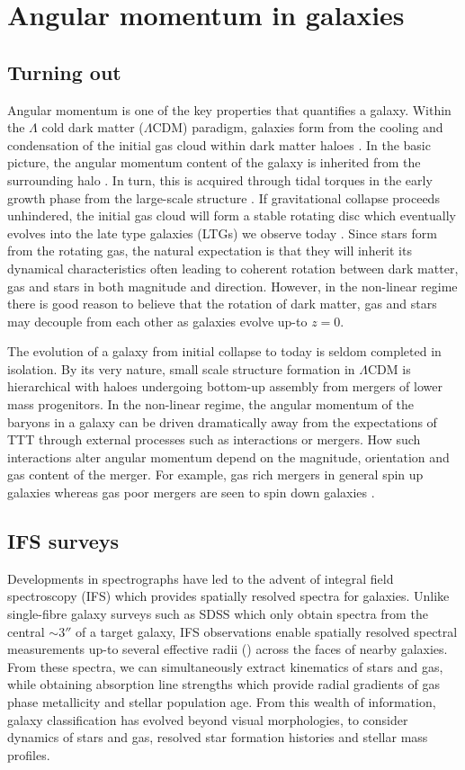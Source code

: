 \section{Angular momentum in galaxies} \label{sec:ang_mom_intro}
\subsection{Turning out}
Angular momentum is one of the key properties that quantifies a galaxy. Within the $\Lambda$ cold dark matter ($\Lambda$CDM) paradigm, galaxies form from the cooling and condensation of the initial gas cloud within dark matter haloes \citep{white1978, mo1998}. In the basic picture, the angular momentum content of the galaxy is inherited from the surrounding halo \citep[][]{fall1980}. In turn, this is acquired through tidal torques in the early growth phase from the large-scale structure \citep[e.g.][]{peebles1969, Doroshkevich1970}. If gravitational collapse proceeds unhindered, the initial gas cloud will form a stable rotating disc which eventually evolves into the late type galaxies (LTGs) we observe today \citep{white1978}. Since stars form from the rotating gas, the natural expectation is that they will inherit its dynamical characteristics often leading to coherent rotation between dark matter, gas and stars in both magnitude and direction. However, in the non-linear regime there is good reason to believe that the rotation of dark matter, gas and stars may decouple from each other as galaxies evolve up-to $z=0$. 

The evolution of a galaxy from initial collapse to today is seldom completed in isolation. By its very nature, small scale structure formation in $\Lambda$CDM is hierarchical with haloes undergoing bottom-up assembly from mergers of lower mass progenitors. In the non-linear regime, the angular momentum of the baryons in a galaxy can be driven dramatically away from the expectations of TTT through external processes such as interactions or mergers. How such interactions alter angular momentum depend on the magnitude, orientation and gas content of the merger. For example, gas rich mergers in general spin up galaxies whereas gas poor mergers are seen to spin down galaxies \citep[][]{lagos2017,lagos2018}.

\subsection{IFS surveys}
Developments in spectrographs have led to the advent of integral field spectroscopy (IFS) which provides spatially resolved spectra for galaxies. Unlike single-fibre galaxy surveys such as SDSS which only obtain spectra from the central $\sim 3 ''$ of a target galaxy, IFS observations enable spatially resolved spectral measurements up-to several effective radii (\re) across the faces of nearby galaxies. From these spectra, we can simultaneously extract kinematics of stars and gas, while obtaining absorption line strengths which provide radial gradients of gas phase metallicity and stellar population age. From this wealth of information, galaxy classification has evolved beyond visual morphologies, to consider dynamics of stars and gas, resolved star formation histories and stellar mass profiles. 

